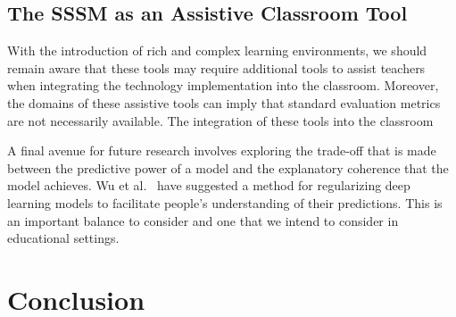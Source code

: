 \subsection{The SSSM as an Assistive Classroom Tool}\label{sec:class-assistive}
With the introduction of rich and complex learning environments, we should remain aware that these tools may require additional tools to assist teachers when integrating the technology implementation into the classroom. Moreover, the domains of these assistive tools can imply that standard evaluation metrics are not necessarily available. The integration of these tools into the classroom 

A final avenue for future research involves exploring the trade-off that is made between the predictive power of a model and the explanatory coherence that the model achieves.  Wu et al.~\cite{wu2017beyond} have suggested a method for regularizing deep learning models to facilitate people's understanding of their predictions. This is an important balance to consider and one that we intend to consider in educational settings.

\section{Conclusion}

